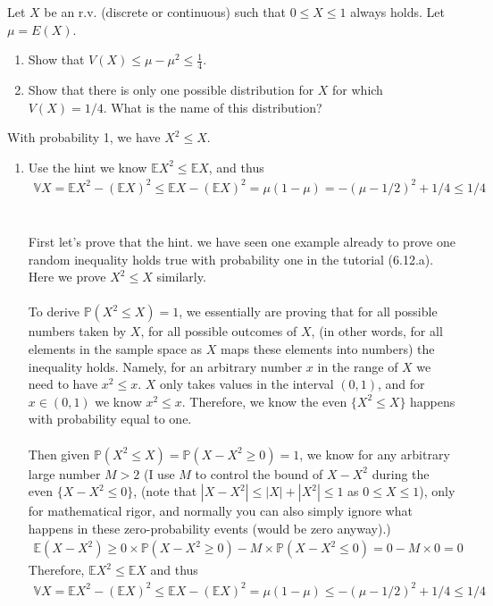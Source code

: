 

\setcounter{theorem}{50}
\begin{exercise}[BH.5.51] Let $X$ be an r.v. (discrete or continuous) such that $0 \leq X \leq 1$ always holds. Let $\mu = E(X)$.
	\begin{enumerate}
		\item Show that $V(X) \leq \mu - \mu^2 \leq \frac{1}{4}$.
		\item Show that there is only one possible distribution for $X$ for which $V(X) = 1/4$. What is the name of this distribution?
	\end{enumerate}
\begin{hint}
	With probability 1, we have $X^2 \leq X$.
\end{hint}
\begin{solution}
    \begin{enumerate}
	    \item Use the hint we know $\mathbb{E}X^2\leq \mathbb{E}X$, and thus 
    	\begin{align*}
    		\mathbb{V}X= \mathbb{E}X^2-(\mathbb{E}X)^2\leq \mathbb{E}X-(\mathbb{E}X)^2=\mu(1-\mu) = -(\mu-1/2)^2 +1/4\leq  1/4 
    	\end{align*} 
    	~\\~\\
    	First let's prove that the hint. we have seen one example already to prove one random inequality holds true with probability one in the tutorial (6.12.a). Here we prove $X^2\leq X$ similarly. \\~\\
    	To derive $\mathbb{P}(X^2\leq X) =1$, we essentially are proving that for all possible numbers taken by $X$, for all possible outcomes of $X$, (in other words, for all elements in the sample space as $X$ maps these elements into numbers) the inequality holds. Namely, for an arbitrary number $x$ in the range of $X$ we need to have $x^2\leq x$. $X$ only takes values in the interval $(0,1)$, and for $x\in(0,1)$ we know $x^2\leq x$. Therefore, we know the even $\{X^2\leq X\}$ happens with probability equal to one.     \\~\\
    	Then given $\mathbb{P}(X^2\leq X)=\mathbb{P}( X-X^2\geq 0)=1$,
    	we know for any arbitrary large number $M>2$ (I use $M$ to control the bound of $X-X^2$ during the even $\{X-X^2\leq 0\}$, (note that $|X-X^2|\leq|X|+|X^2| \leq 1$ as $0\leq X\leq 1$), only for mathematical rigor, and normally you can also simply ignore what happens in these zero-probability events (would be zero anyway).)
    	\begin{align*}
    		\mathbb{E}(X-X^2) \geq 0 \times  \mathbb{P}( X-X^2\geq 0) - M \times  \mathbb{P}( X-X^2\leq 0)=0-M\times 0=0 
    	\end{align*}
    	Therefore, $\mathbb{E}X^2\leq \mathbb{E}X$ and thus 
    	\begin{align*}
    		\mathbb{V}X= \mathbb{E}X^2-(\mathbb{E}X)^2\leq \mathbb{E}X-(\mathbb{E}X)^2=\mu(1-\mu) \leq -(\mu-1/2)^2 +1/4\leq  1/4 
    	\end{align*} 
    	

\end{enumerate}
\end{solution}
\end{exercise}
